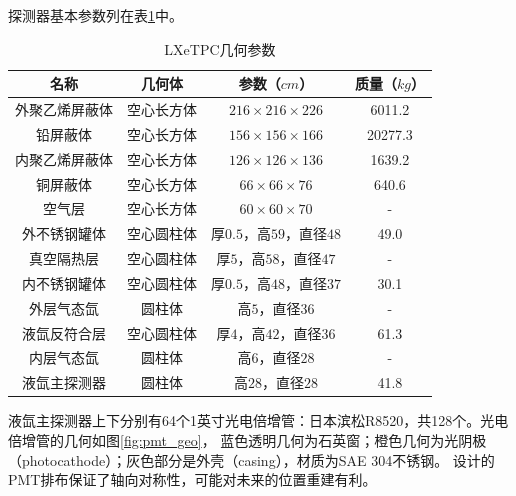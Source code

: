 探测器基本参数列在表\ref{tab:relics_material}中。

\begin{table}
  \centering
  \caption{LXeTPC几何参数}
  \begin{tabular}{cccc}
    \toprule
    名称 & 几何体 & 参数（$\si{cm}$） & 质量（$\si{kg}$） \\
    \midrule
    外聚乙烯屏蔽体 & 空心长方体 & $216\times216\times226$ & 6011.2 \\
    铅屏蔽体 & 空心长方体 & $156\times156\times166$ & 20277.3 \\
    内聚乙烯屏蔽体 & 空心长方体 & $126\times126\times136$ & 1639.2 \\
    铜屏蔽体 & 空心长方体 & $66\times66\times76$ & 640.6 \\
    空气层 & 空心长方体 & $60\times60\times70$ & - \\
    外不锈钢罐体 & 空心圆柱体 & 厚$0.5$，高$59$，直径$48$ & 49.0 \\
    真空隔热层 & 空心圆柱体 & 厚$5$，高$58$，直径$47$ & - \\
    内不锈钢罐体 & 空心圆柱体 & 厚$0.5$，高$48$，直径$37$ & 30.1 \\
    外层气态氙 & 圆柱体 & 高$5$，直径$36$ & - \\
    液氙反符合层 & 空心圆柱体 & 厚$4$，高$42$，直径$36$ & 61.3 \\
    内层气态氙 & 圆柱体 & 高$6$，直径$28$ & - \\
    液氙主探测器 & 圆柱体 & 高$28$，直径$28$ & 41.8 \\
    \bottomrule
  \end{tabular}
  \label{tab:relics_material}
\end{table}

液氙主探测器上下分别有64个1英寸光电倍增管：日本滨松R8520，共128个。光电倍增管的几何如图\ref{fig:pmt_geo}，
蓝色透明几何为石英窗；橙色几何为光阴极（photocathode）；灰色部分是外壳（casing），材质为SAE 304不锈钢。
设计的PMT排布保证了轴向对称性，可能对未来的位置重建有利。

